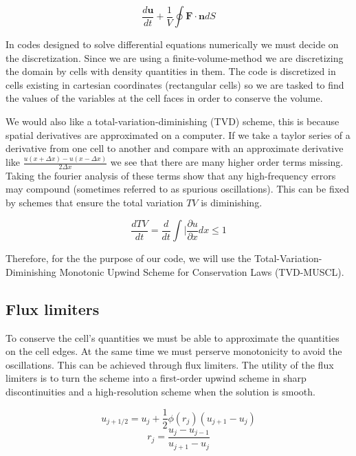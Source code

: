 \documentclass[12pt,upcase]{umlthesis}
\begin{document}
\begin{equation}\label{eq:geneulerint}
	\frac{d\textbf{u}}{dt} + \frac{1}{V} \oint \textbf{F} \cdot \textbf{n} dS
\end{equation}

In codes designed to solve differential equations numerically we must decide on the discretization. Since we are using a finite-volume-method we are discretizing the domain by cells with density quantities in them. The code is discretized in cells existing in cartesian coordinates (rectangular cells) so we are tasked to find the values of the variables at the cell faces in order to conserve the volume.

We would also like a total-variation-diminishing (TVD) scheme, this is because spatial derivatives are approximated on a computer. If we take a taylor series of a derivative from one cell to another and compare with an approximate derivative like $\frac{u(x+\Delta x)-u(x-\Delta x)}{2\Delta x}$ we see that there are many higher order terms missing. Taking the fourier analysis of these terms show that any high-frequency errors may compound (sometimes referred to as spurious oscillations). This can be fixed by schemes that ensure the total variation $TV$ is diminishing.

\begin{equation}\label{eq:tvd}
	\frac{dTV}{dt} = \frac{d}{dt} \int \lvert \frac{\partial u}{\partial x} dx \leq 1
\end{equation}

Therefore, for the the purpose of our code, we will use the Total-Variation-Diminishing Monotonic Upwind Scheme for Conservation Laws (TVD-MUSCL).

\subsection{Flux limiters}\label{sec:fluxlimiters}

To conserve the cell's quantities we must be able to approximate the quantities on the cell edges. At the same time we must perserve monotonicity to avoid the oscillations. This can be achieved through flux limiters. The utility of the flux limiters is to turn the scheme into a first-order upwind scheme in sharp discontinuities and a high-resolution scheme when the solution is smooth.

\begin{equation}\label{eq:fluxlimiter}
	u_{j+1/2} = u_j + \frac{1}{2} \phi(r_j) (u_{j+1} - u_j)
\end{equation}
\begin{equation}
	r_j = \frac{u_j - u_{j-1}}{u_{j+1} - u_j}
\end{equation}
\end{document}
